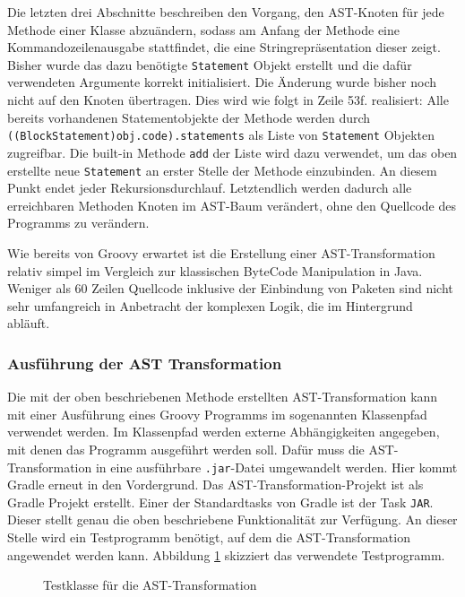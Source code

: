 Die letzten drei Abschnitte beschreiben den Vorgang, den AST-Knoten für jede Methode einer Klasse abzuändern, sodass am Anfang der Methode eine Kommandozeilenausgabe stattfindet, die eine Stringrepräsentation dieser zeigt. 
Bisher wurde das dazu benötigte \texttt{Statement} Objekt erstellt und die dafür verwendeten Argumente korrekt initialisiert. 
Die Änderung wurde bisher noch nicht auf den Knoten übertragen. 
Dies wird wie folgt in Zeile 53f. realisiert:
Alle bereits vorhandenen Statementobjekte der Methode werden durch \texttt{((BlockStatement)obj.code).statements} als Liste von \texttt{Statement} Objekten zugreifbar. Die built-in Methode \texttt{add} der Liste wird dazu verwendet, um das oben erstellte neue \texttt{Statement} an erster Stelle der Methode einzubinden. 
An diesem Punkt endet jeder Rekursionsdurchlauf. 
Letztendlich werden dadurch alle erreichbaren Methoden Knoten im AST-Baum verändert, ohne den Quellcode des Programms zu verändern. 

Wie bereits von Groovy erwartet ist die Erstellung einer AST-Transformation relativ simpel im Vergleich zur klassischen ByteCode Manipulation in Java.
Weniger als 60 Zeilen Quellcode inklusive der Einbindung von Paketen sind nicht sehr umfangreich in Anbetracht der komplexen Logik, die im Hintergrund abläuft. \pagebreak


\subsubsection{Ausführung der AST Transformation}
Die mit der oben beschriebenen Methode erstellten AST-Transformation kann mit einer Ausführung eines Groovy Programms im sogenannten Klassenpfad verwendet werden. 
Im Klassenpfad werden externe Abhängigkeiten angegeben, mit denen das Programm ausgeführt werden soll. 
Dafür muss die AST-Transformation in eine ausführbare \texttt{.jar}-Datei umgewandelt werden. 
Hier kommt Gradle erneut in den Vordergrund. 
Das AST-Transformation-Projekt ist als Gradle Projekt erstellt. 
Einer der Standardtasks von Gradle ist der Task \texttt{JAR}. 
Dieser stellt genau die oben beschriebene Funktionalität zur Verfügung. 
An dieser Stelle wird ein Testprogramm benötigt, auf dem die AST-Transformation angewendet werden kann. 
Abbildung \ref{fig:Greeter} skizziert das verwendete Testprogramm.

\begin{figure}[hbt!]
	
	\caption{Testklasse für die AST-Transformation}
	\label{fig:Greeter}
\end{figure}

